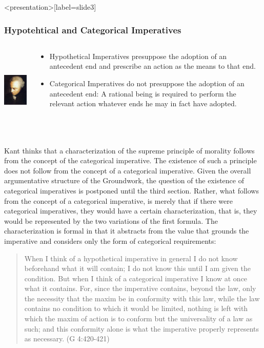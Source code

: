 \begin{frame}<presentation>[label=slide3]
    \frametitle{Hypotehtical and Categorical Imperatives}
        \begin{columns}
            \begin{column}{3cm}
                \includegraphics[height=4cm]{../../graphics/kant.jpg}
            \end{column}
            \begin{column}{7cm}
                \begin{itemize}
                    \item \alert{Hypothetical Imperatives} presuppose the adoption of an antecedent end and prescribe an action as the means to that end.
                    \item \alert{Categorical Imperatives} do not presuppose the adoption of an antecedent end: A rational being is required to perform the relevant action whatever ends he may in fact have adopted.
                \end{itemize}
            \end{column}
        \end{columns}
\end{frame}

Kant thinks that a characterization of the supreme principle of morality follows from the concept of the categorical imperative. The existence of such a principle does not follow from the concept of a categorical imperative. Given the overall argumentative structure of the Groundwork, the question of the existence of categorical imperatives is postponed until the third section. Rather, what follows from the concept of a categorical imperative, is merely that if there were categorical imperatives, they would have a certain characterization, that is, they would be represented by the two variations of the first formula. The characterization is formal in that it abstracts from the value that grounds the imperative and considers only the form of categorical requirements:

\begin{quote}
	When I think of a hypothetical imperative in general I do not know beforehand what it will contain; I do not know this until I am given the condition. But when I think of a categorical imperative I know at once what it contains. For, since the imperative contains, beyond the law, only the necessity that the maxim be in conformity with this law, while the law contains no condition to which it would be limited, nothing is left with which the maxim of action is to conform but the universality of a law as such; and this conformity alone is what the imperative properly represents as necessary. (G 4:420-421)
\end{quote}

